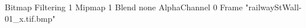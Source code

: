 {Bitmap
	{Filtering 1}
	{Mipmap 1}
	{Blend none}
	{AlphaChannel 0}
	{Frame "railwayStWall-01_x.tif.bmp"}
}
